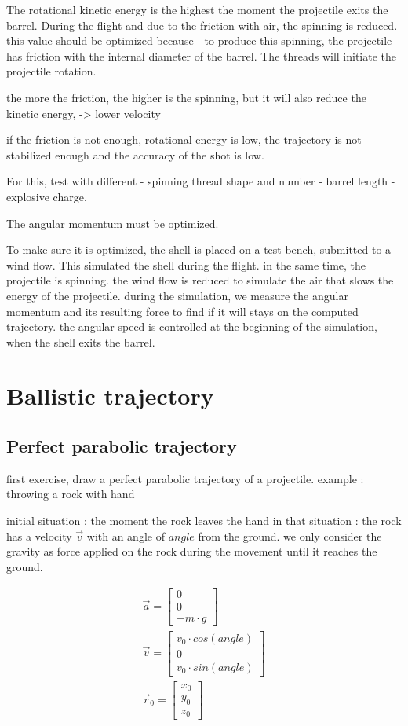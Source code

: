 \documentclass[12pt,a4paper]{article}
\begin{document}
The rotational kinetic energy is the highest the moment the projectile exits the barrel. During the flight and due to the friction with air, the spinning is reduced.
this value should be optimized because
- to produce this spinning, the projectile has friction with the internal diameter of the barrel. The threads will initiate the projectile rotation. 

the more the friction, the higher is the spinning, but it will also reduce the kinetic energy, -> lower velocity

if the friction is not enough, rotational energy is low, the trajectory is not stabilized enough and the accuracy of the shot is low. 

For this, test with different 
- spinning thread shape and number
- barrel length
- explosive charge. 

The angular momentum must be optimized.

To make sure it is optimized, the shell is placed on a test bench, submitted to a wind flow. This simulated the shell during the flight. in the same time, the projectile is spinning. 
the wind flow is reduced to simulate the air that slows the energy of the projectile. during the simulation, we measure the angular momentum and its resulting force to find if it will stays on the computed trajectory. 
the angular speed is controlled at the beginning of the simulation, when the shell exits the barrel. 

\newpage

\section{Ballistic trajectory}
\subsection{Perfect parabolic trajectory}
first exercise, draw a perfect parabolic trajectory of a projectile.
example : throwing a rock with hand

initial situation : the moment the rock leaves the hand
in that situation : the rock has a velocity $\vec{v}$ with an angle of $angle$ from the ground.
we only consider the gravity as force applied on the rock during the movement until it reaches the ground.

\begin{eqnarray}
	\vec{a} = \begin{bmatrix}
		0 \\
		0\\
		- m \cdot g
	\end{bmatrix} \\
	\vec{v} = \begin{bmatrix}
		v_0 \cdot cos(angle) \\
		0\\
		v_0 \cdot sin(angle)
	\end{bmatrix} \\
	\vec{r}_0 = \begin{bmatrix}
		x_0 \\
		y_0\\
		z_0
	\end{bmatrix} \\
\end{eqnarray}
\end{document}

